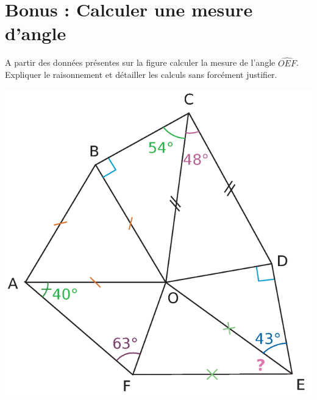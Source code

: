 \section{Bonus : Calculer une mesure d'angle}

A partir des données présentes sur la figure calculer la mesure de l'angle $\widehat{OEF}$. Expliquer le raisonnement et détailler les calculs sans forcément justifier.

\begin{center}
	\includegraphics[scale=0.6]{img/fig3}
\end{center}